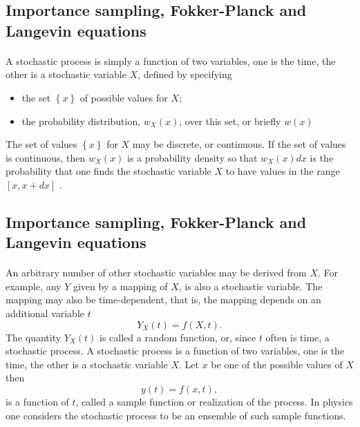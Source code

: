 \documentclass[%
twoside,                 %
final,                   %
10pt]{article}
\begin{document}
\subsection*{Importance sampling, Fokker-Planck and Langevin equations}

\paragraph{}
A stochastic process is simply a function of two variables, one is the time,
the other is a stochastic variable $X$, defined by specifying
\begin{itemize}
\item the set $\left\{x\right\}$ of possible values for $X$;

\item the probability distribution, $w_X(x)$,  over this set, or briefly $w(x)$
\end{itemize}

\noindent
The set of values $\left\{x\right\}$ for $X$ 
may be discrete, or continuous. If the set of
values is continuous, then $w_X (x)$ is a probability density so that 
$w_X (x)dx$
is the probability that one finds the stochastic variable $X$ to have values
in the range $[x, x + dx]$ .




\subsection*{Importance sampling, Fokker-Planck and Langevin equations}

\paragraph{}
     An arbitrary number of other stochastic variables may be derived from
$X$. For example, any $Y$ given by a mapping of $X$, is also a stochastic
variable. The mapping may also be time-dependent, that is, the mapping
depends on an additional variable $t$
\[
                              Y_X (t) = f (X, t) .
\]
The quantity $Y_X (t)$ is called a random function, or, since $t$ often is time,
a stochastic process. A stochastic process is a function of two variables,
one is the time, the other is a stochastic variable $X$. Let $x$ be one of the
possible values of $X$ then
\[
                               y(t) = f (x, t),
\]
is a function of $t$, called a sample function or realization of the process.
In physics one considers the stochastic process to be an ensemble of such
sample functions.
\end{document}
